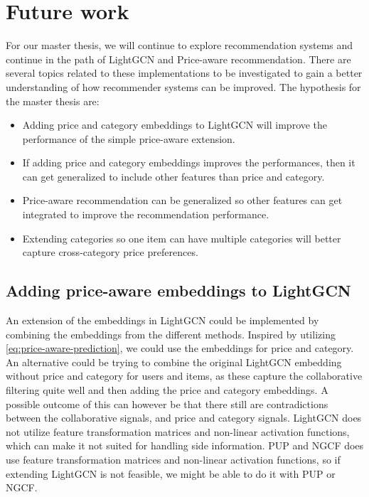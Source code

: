 \section{Future work}
For our master thesis, we will continue to explore recommendation systems and continue in the path of LightGCN and Price-aware recommendation.
There are several topics related to these implementations to be investigated to gain a better understanding of how recommender systems can be improved.
The hypothesis for the master thesis are:
\begin{itemize}
    \item Adding price and category embeddings to LightGCN will improve the performance of the simple price-aware extension.
    \item If adding price and category embeddings improves the performances, then it can get generalized to include other features than price and category.
    \item Price-aware recommendation can be generalized so other features can get integrated to improve the recommendation performance.
    \item Extending categories so one item can have multiple categories will better capture cross-category price preferences.
\end{itemize}

\subsection{Adding price-aware embeddings to LightGCN}
An extension of the embeddings in LightGCN could be implemented by combining the embeddings from the different methods.
Inspired by utilizing \autoref{eq:price-aware-prediction}, we could use the embeddings for price and category.
An alternative could be trying to combine the original LightGCN embedding without price and category for users and items, as these capture the collaborative filtering quite well and then adding the price and category embeddings.
A possible outcome of this can however be that there still are contradictions between the collaborative signals, and price and category signals.
LightGCN does not utilize feature transformation matrices and non-linear activation functions, which can make it not suited for handling side information.
PUP and NGCF does use feature transformation matrices and non-linear activation functions, so if extending LightGCN is not feasible, we might be able to do it with PUP or NGCF.

